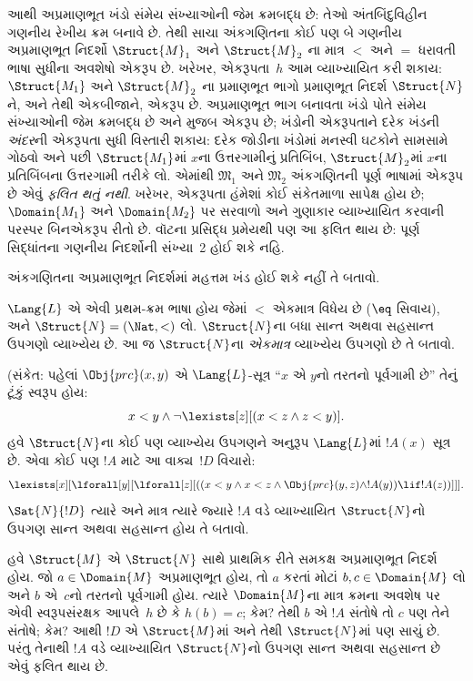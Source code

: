 આથી અપ્રમાણભૂત
ખંડો સંમેય
સંખ્યાઓની જેમ
ક્રમબદ્ધ છે:
તેઓ અંતબિંદુવિહીન
ગણનીય
રેખીય ક્રમ બનાવે
છે. તેથી સાચા
અંકગણિતના
કોઈ પણ બે
ગણનીય
અપ્રમાણભૂત
નિદર્શો
$\Struct{M}_1$
અને $\Struct{M}_2$
ના માત્ર $<$
અને $=$ ધરાવતી
ભાષા સુધીના
અવશેષો એકરૂપ
છે. ખરેખર,
એકરૂપતા~$h$
આમ વ્યાખ્યાયિત
કરી શકાય:
$\Struct{M_1}$
અને $\Struct{M}_2$
ના પ્રમાણભૂત
ભાગો પ્રમાણભૂત
નિદર્શ
$\Struct{N}$ને,
અને તેથી
એકબીજાને,
એકરૂપ છે.
અપ્રમાણભૂત
ભાગ બનાવતા
ખંડો પોતે
સંમેય સંખ્યાઓની
જેમ ક્રમબદ્ધ
છે અને
મુજબ એકરૂપ
છે; ખંડોની
એકરૂપતાને
દરેક ખંડની
\emph{અંદર}ની
એકરૂપતા સુધી
વિસ્તારી શકાય:
દરેક જોડીના
ખંડોમાં મનસ્વી
ઘટકોને સામસામે
ગોઠવો અને પછી
$\Struct{M_1}$માં
$x$ના ઉત્તરગામીનું
પ્રતિબિંબ,
$\Struct{M}_2$માં
$x$ના પ્રતિબિંબના
ઉત્તરગામી તરીકે
લો. એમાંથી
$\mathfrak{M}_1$
અને $\mathfrak{M}_2$
અંકગણિતની પૂર્ણ
ભાષામાં એકરૂપ
છે એવું
\emph{ફલિત થતું નથી}.
ખરેખર, એકરૂપતા
હંમેશાં કોઈ
સંકેતમાળા સાપેક્ષ
હોય છે; $\Domain{M_1}$
અને $\Domain{M_2}$
પર સરવાળો અને
ગુણાકાર વ્યાખ્યાયિત
કરવાની પરસ્પર
બિનએકરૂપ રીતો
છે. વૉટના
પ્રસિદ્ધ પ્રમેયથી
પણ આ ફલિત
થાય છે: પૂર્ણ
સિદ્ધાંતના
ગણનીય નિદર્શોની
સંખ્યા~2
હોઈ શકે નહિ.

\begin{prob}
અંકગણિતના અપ્રમાણભૂત નિદર્શમાં
મહત્તમ ખંડ હોઈ શકે નહીં તે બતાવો.
\end{prob}

\begin{prob}
$\Lang{L}$ એ એવી પ્રથમ-ક્રમ ભાષા
હોય જેમાં $<$ એકમાત્ર વિધેય
છે ($\eq$ સિવાય), અને
$\Struct{N} = (\Nat,
<)$ લો. $\Struct{N}$ના બધા
સાન્ત અથવા સહસાન્ત ઉપગણો
વ્યાખ્યેય છે. આ જ
$\Struct{N}$ના \emph{એકમાત્ર}
વ્યાખ્યેય ઉપગણો છે તે
બતાવો.

(સંકેત: પહેલાં
$\Obj{prc}(x,y)$ એ
$\Lang{L}$-સૂત્ર
“$x$ એ $y$નો
તરતનો પૂર્વગામી છે”
તેનું ટૂંકું સ્વરૂપ
હોય:
\[
x<y \land \lnot \lexists[z][(x<z \land z < y)].
\]
હવે $\Struct{N}$ના
કોઈ પણ વ્યાખ્યેય
ઉપગણને અનુરૂપ
$\Lang{L}$માં
$!A(x)$ સૂત્ર છે.
એવા કોઈ પણ
$!A$ માટે
આ વાક્ય~$!D$
વિચારો:
\[
\lexists[x][\lforall[y][\lforall[z][((x<y \land x<z \land \Obj{prc}(y,z)
  \land !A(y)) \lif !A(z))]]].
\]
$\Sat{N}{!D}$ ત્યારે
અને માત્ર ત્યારે
જ્યારે $!A$ વડે
વ્યાખ્યાયિત
$\Struct{N}$નો
ઉપગણ સાન્ત
અથવા સહસાન્ત
હોય તે બતાવો.

હવે $\Struct{M}$
એ $\Struct{N}$
સાથે પ્રાથમિક
રીતે સમકક્ષ
અપ્રમાણભૂત
નિદર્શ હોય.
જો $a \in
\Domain{M}$
અપ્રમાણભૂત હોય,
તો $a$ કરતાં
મોટાં $b, c \in
\Domain{M}$ લો
અને $b$ એ~$c$નો
તરતનો પૂર્વગામી
હોય. ત્યારે
$\Domain{M}$ના
માત્ર ક્રમના
અવશેષ પર એવી
સ્વરૂપસંરક્ષક
આપલે~$h$ છે
કે $h(b)=c$;
કેમ? તેથી
$b$ એ $!A$
સંતોષે તો
$c$ પણ તેને
સંતોષે; કેમ?
આથી $!D$
એ $\Struct{M}$માં
અને તેથી
$\Struct{N}$માં
પણ સાચું છે.
પરંતુ તેનાથી
$!A$ વડે
વ્યાખ્યાયિત
$\Struct{N}$નો
ઉપગણ સાન્ત
અથવા સહસાન્ત
છે એવું ફલિત
થાય છે.
\end{prob}
\endgroup
\endgroup


